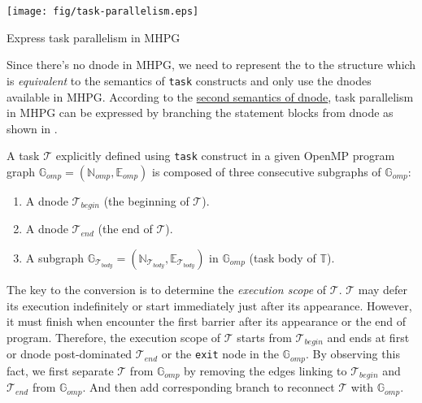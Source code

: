 \begin{center-figure}
	\texttt{[image: fig/task-parallelism.eps]}
	\caption{Express task parallelism in MHPG}
	\label{fig:Task_Parallelism_in_MHPG}
\end{center-figure}

Since there's no  dnode in MHPG, we need to represent the  to the structure which is \textit{equivalent} to the semantics of \verb|task| constructs and only use the dnodes available in MHPG. According to the \hyperref[l:second-semantics-of-mhpg-parallel-node]{second semantics of  dnode}, task parallelism in MHPG can be expressed by branching the statement blocks from  dnode as shown in .

A task $\mathcal{T}$ explicitly defined using \verb|task| construct in a given OpenMP program graph $\mathbb{G}_{omp} = (\mathbb{N}_{omp}, \mathbb{E}_{omp})$ is composed of three consecutive subgraphs of $\mathbb{G}_{omp}$:
\begin{enumerate}
	\item A  dnode $\mathcal{T}_{begin}$ (the beginning of $\mathcal{T}$).
	\item A  dnode $\mathcal{T}_{end}$ (the end of $\mathcal{T}$).
	\item A subgraph $\mathbb{G}_{\mathcal{T}_{body}} = (\mathbb{N}_{\mathcal{T}_{body}}, \mathbb{E}_{\mathcal{T}_{body}})$ in $\mathbb{G}_{omp}$ (task body of $\mathbb{T}$).
\end{enumerate}

The key to the conversion is to determine the \textit{execution scope} of $\mathcal{T}$. $\mathcal{T}$ may defer its execution indefinitely or start immediately just after its appearance. However, it must finish when encounter the first barrier after its appearance or the end of program. Therefore, the execution scope of $\mathcal{T}$ starts from $\mathcal{T}_{begin}$ and ends at first  or  dnode post-dominated $\mathcal{T}_{end}$ or the \verb|exit| node in the $\mathbb{G}_{omp}$. By observing this fact, we  first separate $\mathcal{T}$ from $\mathbb{G}_{omp}$ by removing the edges linking to $\mathcal{T}_{begin}$ and $\mathcal{T}_{end}$ from $\mathbb{G}_{omp}$. And then add corresponding branch to reconnect $\mathcal{T}$ with $\mathbb{G}_{omp}$.

